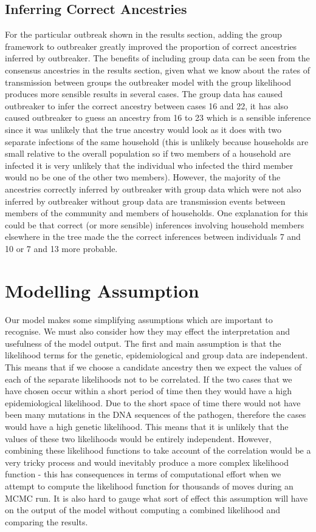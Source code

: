 \documentclass[11pt,a4paper]{report}
\begin{document}
\subsection{Inferring Correct Ancestries}
For the particular outbreak shown in the results section, adding the group framework to outbreaker greatly improved the proportion of correct ancestries inferred by outbreaker. The benefits of including group data can be seen from the consensus ancestries in the results section, given what we know about the rates of transmission between groups the outbreaker model with the group likelihood produces more sensible results in several cases. The group data has caused outbreaker to infer the correct ancestry between cases 16 and 22, it has also caused outbreaker to guess an ancestry from 16 to 23 which is a sensible inference since it was unlikely that the true ancestry would look as it does with two separate infections of the same household (this is unlikely because households are small relative to the overall population so if two members of a household are infected it is very unlikely that the individual who infected the third member would no be one of the other two members). However, the majority of the ancestries correctly inferred by outbreaker with group data which were not also inferred by outbreaker without group data are transmission events between members of the community and members of households. One explanation for this could be that correct (or more sensible) inferences involving household members elsewhere in the tree made the the correct inferences between individuals 7 and 10 or 7 and 13 more probable.  

\section{Modelling Assumption}
Our model makes some simplifying assumptions which are important to recognise. We must also consider how they may effect the interpretation and usefulness of the model output. The first and main assumption is that the likelihood terms for the genetic, epidemiological and group data are independent. This means that if we choose a candidate ancestry then we expect the values of each of the separate likelihoods not to be correlated. If the two cases that we have chosen occur within a short period of time then they would have a high epidemiological likelihood. Due to the short space of time there would not have been many mutations in the DNA sequences of the pathogen, therefore the cases would have a high genetic likelihood. This means that it is unlikely that the values of these two likelihoods would be entirely independent. However, combining these likelihood functions to take account of the correlation would be a very tricky process and would inevitably produce a more complex likelihood function - this has consequences in terms of computational effort when we attempt to compute the likelihood function for thousands of moves during an MCMC run. It is also hard to gauge what sort of effect this assumption will have on the output of the model without computing a combined likelihood and comparing the results.
\end{document}
